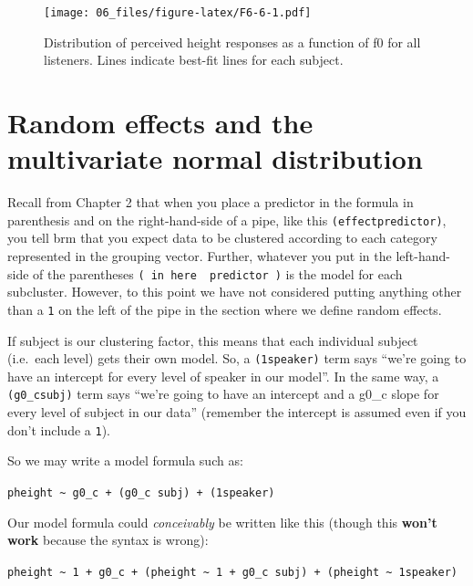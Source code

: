 \documentclass[
]{book}
\begin{document}
\begin{figure}
\centering
\texttt{[image: 06\_files/figure-latex/F6-6-1.pdf]}
\caption{\label{fig:F6-6}Distribution of perceived height responses as a function of f0 for all listeners. Lines indicate best-fit lines for each subject.}
\end{figure}

\hypertarget{random-effects-and-the-multivariate-normal-distribution}{%
\section{Random effects and the multivariate normal distribution}\label{random-effects-and-the-multivariate-normal-distribution}}

Recall from Chapter 2 that when you place a predictor in the formula in parenthesis and on the right-hand-side of a pipe, like this \texttt{(effect\textbar{}predictor)}, you tell brm that you expect data to be clustered according to each category represented in the grouping vector. Further, whatever you put in the left-hand-side of the parentheses \texttt{(\ in\ here\ \textbar{}\ predictor\ )} is the model for each subcluster. However, to this point we have not considered putting anything other than a \texttt{1} on the left of the pipe in the section where we define random effects.

If subject is our clustering factor, this means that each individual subject (i.e.~each level) gets their own model. So, a \texttt{(1\textbar{}speaker)} term says ``we're going to have an intercept for every level of speaker in our model''. In the same way, a \texttt{(g0\_c\textbar{}subj)} term says ``we're going to have an intercept and a g0\_c slope for every level of subject in our data'' (remember the intercept is assumed even if you don't include a \texttt{1}).

So we may write a model formula such as:

\texttt{pheight\ \textasciitilde{}\ g0\_c\ +\ (g0\_c\ \textbar{}subj)\ +\ (1\textbar{}speaker)}

Our model formula could \emph{conceivably} be written like this (though this \textbf{won't work} because the syntax is wrong):

\texttt{pheight\ \textasciitilde{}\ 1\ +\ g0\_c\ +\ (pheight\ \textasciitilde{}\ 1\ +\ g0\_c\ \textbar{}subj)\ +\ (pheight\ \textasciitilde{}\ 1\textbar{}speaker)}
\end{document}
